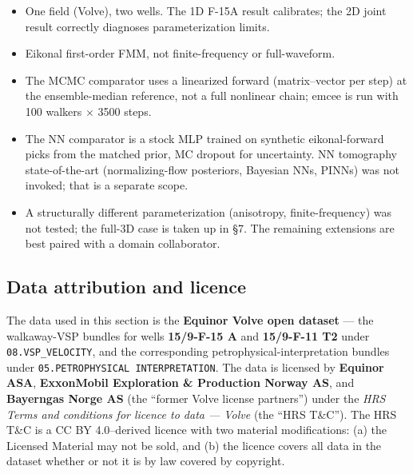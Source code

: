 \documentclass[11pt]{article}
\newcommand{\file}[1]{\texttt{#1}}
\begin{document}
\begin{itemize}
\item One field (Volve), two wells. The 1D F-15A result calibrates; the
  2D joint result correctly diagnoses parameterization limits.
\item Eikonal first-order FMM, not finite-frequency or full-waveform.
\item The MCMC comparator uses a linearized forward (matrix--vector per
  step) at the ensemble-median reference, not a full nonlinear chain;
  emcee is run with 100 walkers $\times$ 3500 steps.
\item The NN comparator is a stock MLP trained on synthetic
  eikonal-forward picks from the matched prior, MC dropout for uncertainty.
  NN tomography state-of-the-art (normalizing-flow posteriors, Bayesian
  NNs, PINNs) was not invoked; that is a separate scope.
\item A structurally different parameterization (anisotropy,
  finite-frequency) was not tested; the full-3D case is taken up in \S7.
  The remaining extensions are best paired with a domain collaborator.
\end{itemize}

\subsection{Data attribution and licence}
\label{sec:realdata-licence}

The data used in this section is the \textbf{Equinor Volve open dataset} ---
the walkaway-VSP bundles for wells \textbf{15/9-F-15 A} and
\textbf{15/9-F-11 T2} under \file{08.VSP\_VELOCITY}, and the corresponding
petrophysical-interpretation bundles under
\file{05.PETROPHYSICAL INTERPRETATION}. The data is licensed by
\textbf{Equinor ASA}, \textbf{ExxonMobil Exploration \& Production Norway AS},
and \textbf{Bayerngas Norge AS} (the ``former Volve license partners'')
under the \emph{HRS Terms and conditions for licence to data --- Volve}
(the ``HRS T\&C''). The HRS T\&C is a CC BY 4.0--derived licence with two
material modifications: (a) the Licensed Material may not be sold, and
(b) the licence covers all data in the dataset whether or not it is by law
covered by copyright.
\end{document}
